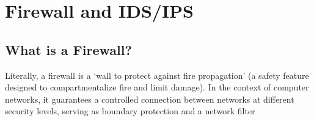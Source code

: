 \chapter{Firewall and IDS/IPS}
\cite{05_Firewalling}

\section*{What is a Firewall?}
Literally, a firewall is a ‘wall to protect against fire propagation’ (a safety feature designed to compartmentalize fire and limit damage). In the context of computer networks, it guarantees a controlled connection between networks at different security levels, serving as boundary protection and a network filter